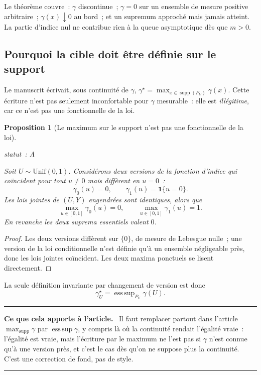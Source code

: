 \documentclass[11pt]{article}
\theoremstyle{plain}
\newtheorem{proposition}[theoreme]{Proposition}
\theoremstyle{definition}
\theoremstyle{remark}
\DeclareMathOperator*{\esssup}{ess\,sup}
\DeclareMathOperator{\supp}{supp}
\newcommand{\1}{\mathbf 1}
\newcommand{\gU}{\gamma^\star_U}
\newcommand{\statut}[1]{%
  \nopagebreak\par\nopagebreak
  \hfill{\normalfont\footnotesize\textcolor{gris}{statut~: #1}}%
  \par\nopagebreak\vspace{-2pt}}
\newenvironment{apport}
  {\par\medskip\noindent\begingroup\color{bleu}\rule{\linewidth}{0.6pt}\par
   \nobreak\vspace{2pt}\noindent\textbf{Ce que cela apporte à l'article.}\ \normalcolor}
  {\par\vspace{2pt}\noindent\textcolor{bleu}{\rule{\linewidth}{0.6pt}}\endgroup\par\medskip}
\begin{document}
\noindent
Le théorème couvre~: $\gamma$ discontinue~; $\gamma=0$ sur un ensemble de
mesure positive arbitraire~; $\gamma(x)\downarrow0$ au bord~; et un
supremum approché mais jamais atteint. La partie d'indice nul ne
contribue rien à la queue asymptotique dès que $m>0$.

\subsection{Pourquoi la cible doit être définie sur le support}

Le manuscrit écrivait, sous continuité de $\gamma$,
$\gamma^\star=\max_{x\in\supp(P_U)}\gamma(x)$. Cette écriture n'est pas
seulement inconfortable pour $\gamma$ mesurable~: elle est
\emph{illégitime}, car ce n'est pas une fonctionnelle de la loi.

\begin{proposition}[Le maximum sur le support n'est pas une fonctionnelle de la loi]
\label{prop:pas-fonctionnelle}
\statut{A}
Soit $U\sim\mathrm{Unif}(0,1)$. Considérons deux versions de la fonction
d'indice qui coïncident pour tout $u\ne0$ mais diffèrent en $u=0$~:
\[
 \gamma_0(u)=0,\qquad \gamma_1(u)=\1\{u=0\}.
\]
Les lois jointes de $(U,Y)$ engendrées sont \emph{identiques}, alors que
\[
 \max_{u\in[0,1]}\gamma_0(u)=0,
 \qquad
 \max_{u\in[0,1]}\gamma_1(u)=1 .
\]
En revanche les deux suprema essentiels valent $0$.
\end{proposition}

\begin{proof}
Les deux versions diffèrent sur $\{0\}$, de mesure de Lebesgue nulle~;
une version de la loi conditionnelle n'est définie qu'à un ensemble
négligeable près, donc les lois jointes coïncident. Les deux maxima
ponctuels se lisent directement.
\end{proof}

\noindent
La seule définition invariante par changement de version est donc
\begin{equation}
 \boxed{\ \gU=\esssup_{P_U}\gamma(U).\ }
 \label{eq:cible}
\end{equation}

\begin{apport}
Il faut remplacer partout dans l'article $\max_{\supp}\gamma$ par
$\esssup\gamma$, y compris là où la continuité rendait l'égalité vraie~:
l'égalité est vraie, mais l'écriture par le maximum ne l'est pas si
$\gamma$ n'est connue qu'à une version près, et c'est le cas dès qu'on ne
suppose plus la continuité. C'est une correction de fond, pas de style.
\end{apport}
\end{document}
